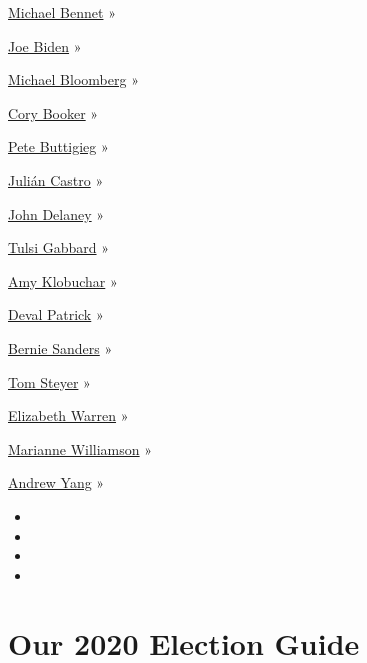 \href{https://www.nytimes.com/interactive/2020/us/elections/michael-bennet.html}{Michael
Bennet} »

\href{https://www.nytimes.com/interactive/2020/us/elections/joe-biden.html}{Joe
Biden} »

\href{https://www.nytimes.com/interactive/2020/us/elections/michael-bloomberg.html}{Michael
Bloomberg} »

\href{https://www.nytimes.com/interactive/2020/us/elections/cory-booker.html}{Cory
Booker} »

\href{https://www.nytimes.com/interactive/2020/us/elections/pete-buttigieg.html}{Pete
Buttigieg} »

\href{https://www.nytimes.com/interactive/2020/us/elections/julian-castro.html}{Julián
Castro} »

\href{https://www.nytimes.com/interactive/2020/us/elections/john-delaney.html}{John
Delaney} »

\href{https://www.nytimes.com/interactive/2020/us/elections/tulsi-gabbard.html}{Tulsi
Gabbard} »

\href{https://www.nytimes.com/interactive/2020/us/elections/amy-klobuchar.html}{Amy
Klobuchar} »

\href{https://www.nytimes.com/interactive/2020/us/elections/deval-patrick.html}{Deval
Patrick} »

\href{https://www.nytimes.com/interactive/2020/us/elections/bernie-sanders.html}{Bernie
Sanders} »

\href{https://www.nytimes.com/interactive/2020/us/elections/tom-steyer.html}{Tom
Steyer} »

\href{https://www.nytimes.com/interactive/2020/us/elections/elizabeth-warren.html}{Elizabeth
Warren} »

\href{https://www.nytimes.com/interactive/2020/us/elections/marianne-williamson.html}{Marianne
Williamson} »

\href{https://www.nytimes.com/interactive/2020/us/elections/andrew-yang.html}{Andrew
Yang} »

\begin{itemize}
\item
\item
\item
\item
\end{itemize}

\hypertarget{our-2020-election-guide}{%
\section{Our 2020 Election Guide}\label{our-2020-election-guide}}

